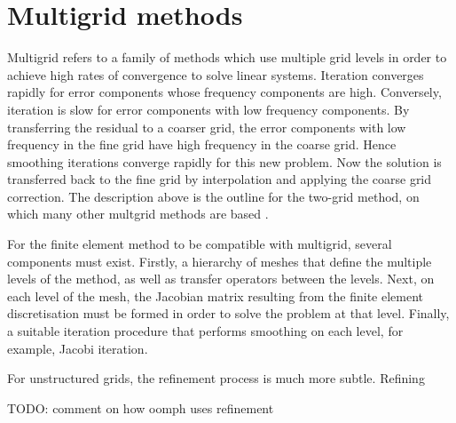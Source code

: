 \section{Multigrid methods}

Multigrid refers to a family of methods which use multiple grid levels in order to achieve high rates of convergence to solve linear systems.
Iteration converges rapidly for error components whose frequency components are high.
Conversely, iteration is slow for error components with low frequency components.
By transferring the residual to a coarser grid, the error components with low frequency in the fine grid have high frequency in the coarse grid.
Hence smoothing iterations converge rapidly for this new problem.
Now the solution is transferred back to the fine grid by interpolation and applying the coarse grid correction.
The description above is the outline for the two-grid method, on which many other multgrid methods are based \cite{hackbusch}.


\iffalse

The Poisson problem:
	- Well behaved
	- Eigenvalues of the residual
	- Optimal method for finding solution

Helmholtz problem:
	- Misbehaved
	- Poor convergence
	- Indefinite discretisation matrix

\fi

For the finite element method to be compatible with multigrid, several components must exist.
Firstly, a hierarchy of meshes that define the multiple levels of the method, as well as transfer operators between the levels.
Next, on each level of the mesh, the Jacobian matrix resulting from the finite element discretisation must be formed in order to solve the problem at that level.
Finally, a suitable iteration procedure that performs smoothing on each level, for example, Jacobi iteration.


For unstructured grids, the refinement process is much more subtle.
Refining 

TODO: comment on how oomph uses refinement
